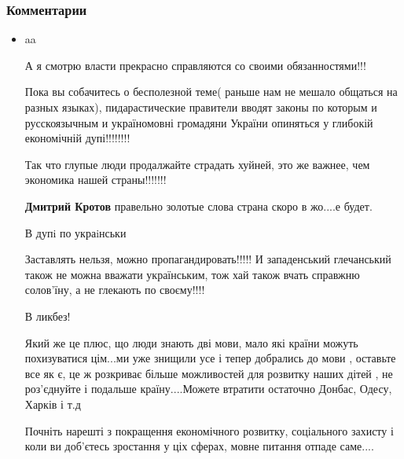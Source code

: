  
 
 
 
 
\clearpage
\subsubsection{Комментарии}
\label{sec:18_06_2020.fb.zharkih_ekaterina.1.mova_jazyk.cmt}

\begin{itemize}
\item aa


А я смотрю власти прекрасно справляются со своими обязанностями!!!

Пока вы собачитесь о бесполезной теме( раньше нам не мешало общаться на разных
языках), пидарастические правители вводят законы по которым и русскоязычным и
україномовні громадяни України опиняться у глибокій економічній дупі!!!!!!!!

Так что глупые люди продалжайте страдать хуйней, это же важнее, чем экономика
нашей страны!!!!!!!



\textbf{Дмитрий Кротов} правельно золотые слова страна скоро в жо....е будет.


В дупi по украiнськи

Заставлять нельзя, можно пропагандировать!!!!!
И западенський глечанський також не можна вважати українським, тож хай також вчать справжню солов'їну, а не глекають по своєму!!!!

В ликбез!


Який же це плюс, що люди знають дві мови, мало які країни можуть похизуватися
цім...ми уже знищили усе і тепер добрались до мови , оставьте все як є, це ж
розкриває більше можливостей для розвитку наших дітей , не роз'єднуйте і
подальше країну....Можете втратити остаточно Донбас, Одесу, Харків і т.д

Почніть нарешті з покращення економічного розвитку, соціального захисту і коли
ви доб'єтесь зростання у ціх сферах, мовне питання отпаде саме....


\end{itemize}
